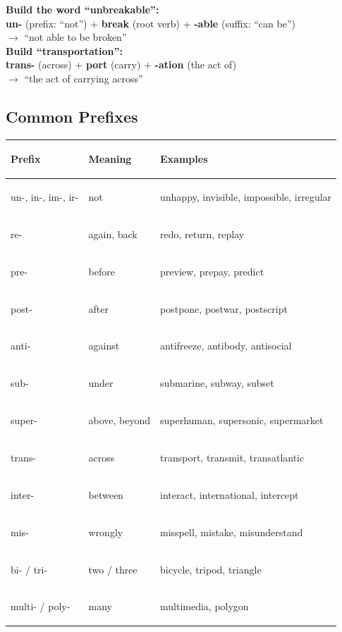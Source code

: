 \documentclass[11pt, letterpaper]{article}
\newcommand{\example}[1]{%
  \begin{tcolorbox}[colback=exbg, colframe=exborder,
    title={\bfseries Example}, arc=3pt, boxrule=1pt]
  #1
  \end{tcolorbox}%
}
\begin{document}
\example{
\textbf{Build the word ``unbreakable'':}\\
\quad\textbf{un-} (prefix: ``not'') + \textbf{break} (root verb) + \textbf{-able} (suffix: ``can be'')\\
$\to$ ``not able to be broken''\\[4pt]
\textbf{Build ``transportation'':}\\
\quad\textbf{trans-} (across) + \textbf{port} (carry) + \textbf{-ation} (the act of)\\
$\to$ ``the act of carrying across''
}

\subsection*{Common Prefixes}

\noindent
{\renewcommand{\arraystretch}{1.4}
\begin{tabularx}{\textwidth}{>{\bfseries\raggedright\arraybackslash}p{2cm}
                              >{\raggedright\arraybackslash}p{3cm}
                              >{\raggedright\arraybackslash}X}
\toprule
\rowcolor{tableheadergreen}
\textbf{Prefix} & \textbf{Meaning} & \textbf{Examples} \\
\midrule
\rowcolor{rowA}  un-, in-, im-, ir-  & not             & unhappy, invisible, impossible, irregular \\
\rowcolor{rowBg} re-                  & again, back     & redo, return, replay \\
\rowcolor{rowA}  pre-                 & before          & preview, prepay, predict \\
\rowcolor{rowBg} post-                & after           & postpone, postwar, postscript \\
\rowcolor{rowA}  anti-                & against         & antifreeze, antibody, antisocial \\
\rowcolor{rowBg} sub-                 & under           & submarine, subway, subset \\
\rowcolor{rowA}  super-               & above, beyond   & superhuman, supersonic, supermarket \\
\rowcolor{rowBg} trans-               & across          & transport, transmit, transatlantic \\
\rowcolor{rowA}  inter-               & between         & interact, international, intercept \\
\rowcolor{rowBg} mis-                 & wrongly         & misspell, mistake, misunderstand \\
\rowcolor{rowA}  bi- / tri-           & two / three     & bicycle, tripod, triangle \\
\rowcolor{rowBg} multi- / poly-       & many            & multimedia, polygon \\
\bottomrule
\end{tabularx}}
\end{document}
